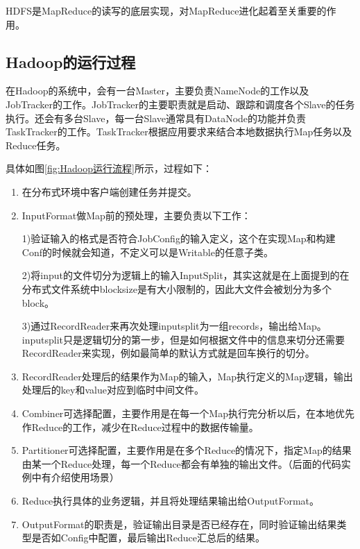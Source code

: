 HDFS是MapReduce的读写的底层实现，对MapReduce进化起着至关重要的作用。

\subsection[Hadoop的运行过程]{Hadoop的运行过程\cite{book:Hadoop}}
在Hadoop的系统中，会有一台Master，主要负责NameNode的工作以及JobTracker的工作。JobTracker的主要职责就是启动、跟踪和调度各个Slave的任务执行。还会有多台Slave，每一台Slave通常具有DataNode的功能并负责TaskTracker的工作。TaskTracker根据应用要求来结合本地数据执行Map任务以及Reduce任务。

具体如图\ref{fig:Hadoop运行流程}所示，过程如下：

\begin{enumerate}
\item 在分布式环境中客户端创建任务并提交。

\item InputFormat做Map前的预处理，主要负责以下工作：

1)验证输入的格式是否符合JobConfig的输入定义，这个在实现Map和构建Conf的时候就会知道，不定义可以是Writable的任意子类。

2)将input的文件切分为逻辑上的输入InputSplit，其实这就是在上面提到的在分布式文件系统中blocksize是有大小限制的，因此大文件会被划分为多个block。

3)通过RecordReader来再次处理inputsplit为一组records，输出给Map。inputsplit只是逻辑切分的第一步，但是如何根据文件中的信息来切分还需要RecordReader来实现，例如最简单的默认方式就是回车换行的切分。

\item RecordReader处理后的结果作为Map的输入，Map执行定义的Map逻辑，输出处理后的key和value对应到临时中间文件。

\item Combiner可选择配置，主要作用是在每一个Map执行完分析以后，在本地优先作Reduce的工作，减少在Reduce过程中的数据传输量。

\item Partitioner可选择配置，主要作用是在多个Reduce的情况下，指定Map的结果由某一个Reduce处理，每一个Reduce都会有单独的输出文件。（后面的代码实例中有介绍使用场景）

\item Reduce执行具体的业务逻辑，并且将处理结果输出给OutputFormat。

\item OutputFormat的职责是，验证输出目录是否已经存在，同时验证输出结果类型是否如Config中配置，最后输出Reduce汇总后的结果。
\end{enumerate}

